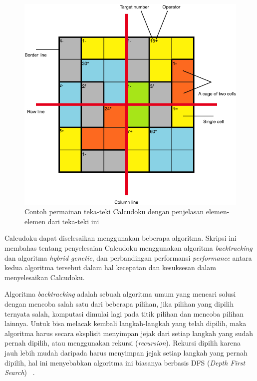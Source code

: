 \begin{figure}
\centering
\captionsetup{justification=centering}
\includegraphics[scale=0.5]{Gambar/HybridGenetic1}
\caption[Contoh permainan teka-teki Calcudoku dengan penjelasan tentang elemen-elemen dari teka-teki ini ~\cite{johanna:12:hybrid}]{Contoh permainan teka-teki Calcudoku dengan penjelasan elemen-elemen dari teka-teki ini ~\cite{johanna:12:hybrid}}
\label{fig:hybrid1}
\end{figure}

Calcudoku dapat diselesaikan menggunakan beberapa algoritma. Skripsi ini membahas tentang penyelesaian Calcudoku menggunakan algoritma \textit{backtracking} dan algoritma \textit{hybrid genetic}, dan perbandingan performansi \textit{performance} antara kedua algoritma tersebut dalam hal kecepatan dan kesuksesan dalam menyelesaikan Calcudoku.

Algoritma \textit{backtracking} adalah sebuah algoritma umum yang mencari solusi dengan mencoba salah satu dari beberapa pilihan, jika pilihan yang dipilih ternyata salah, komputasi dimulai lagi pada titik pilihan dan mencoba pilihan lainnya. Untuk bisa melacak kembali langkah-langkah yang telah dipilih, maka algoritma harus secara eksplisit menyimpan jejak dari setiap langkah yang sudah pernah dipilih, atau menggunakan rekursi (\textit{recursion}). Rekursi dipilih karena jauh lebih mudah daripada harus menyimpan jejak setiap langkah yang pernah dipilih, hal ini menyebabkan algoritma ini biasanya berbasis DFS (\textit{Depth First Search}) ~\cite{fahda:16:backtracking}.

